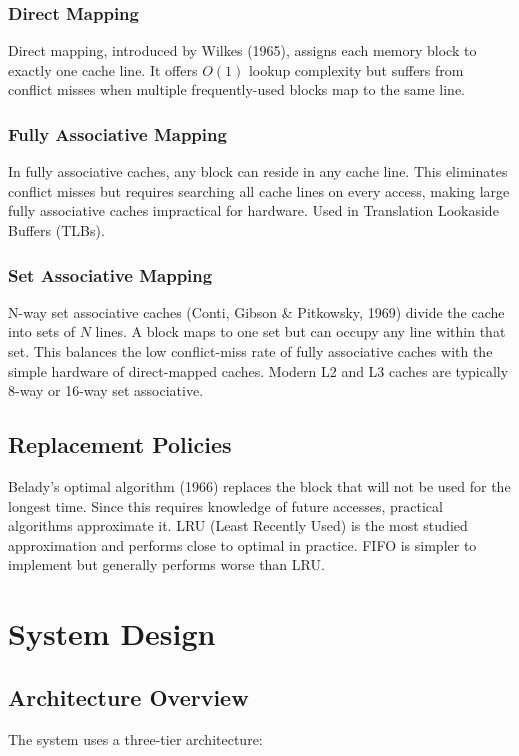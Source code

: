 \documentclass[12pt,a4paper]{report}
\begin{document}
\subsection{Direct Mapping}
Direct mapping, introduced by Wilkes (1965), assigns each memory block to exactly
one cache line. It offers $O(1)$ lookup complexity but suffers from conflict misses
when multiple frequently-used blocks map to the same line.

\subsection{Fully Associative Mapping}
In fully associative caches, any block can reside in any cache line. This eliminates
conflict misses but requires searching all cache lines on every access, making large
fully associative caches impractical for hardware. Used in Translation Lookaside
Buffers (TLBs).

\subsection{Set Associative Mapping}
N-way set associative caches (Conti, Gibson \& Pitkowsky, 1969) divide the cache
into sets of $N$ lines. A block maps to one set but can occupy any line within that
set. This balances the low conflict-miss rate of fully associative caches with the
simple hardware of direct-mapped caches. Modern L2 and L3 caches are typically
8-way or 16-way set associative.

\section{Replacement Policies}
Belady's optimal algorithm (1966) replaces the block that will not be used for the
longest time. Since this requires knowledge of future accesses, practical algorithms
approximate it. LRU (Least Recently Used) is the most studied approximation and
performs close to optimal in practice. FIFO is simpler to implement but generally
performs worse than LRU.

\chapter{System Design}

\section{Architecture Overview}
The system uses a three-tier architecture:
\end{document}
